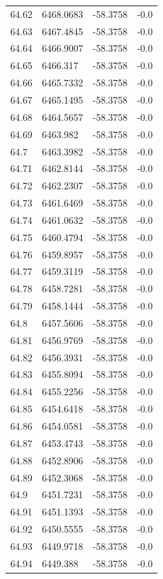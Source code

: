 \begin{table}[H]
\begin{tabular}{llll}
64.62 & 6468.0683 & -58.3758 & -0.0 \\
64.63 & 6467.4845 & -58.3758 & -0.0 \\
64.64 & 6466.9007 & -58.3758 & -0.0 \\
64.65 & 6466.317 & -58.3758 & -0.0 \\
64.66 & 6465.7332 & -58.3758 & -0.0 \\
64.67 & 6465.1495 & -58.3758 & -0.0 \\
64.68 & 6464.5657 & -58.3758 & -0.0 \\
64.69 & 6463.982 & -58.3758 & -0.0 \\
64.7 & 6463.3982 & -58.3758 & -0.0 \\
64.71 & 6462.8144 & -58.3758 & -0.0 \\
64.72 & 6462.2307 & -58.3758 & -0.0 \\
64.73 & 6461.6469 & -58.3758 & -0.0 \\
64.74 & 6461.0632 & -58.3758 & -0.0 \\
64.75 & 6460.4794 & -58.3758 & -0.0 \\
64.76 & 6459.8957 & -58.3758 & -0.0 \\
64.77 & 6459.3119 & -58.3758 & -0.0 \\
64.78 & 6458.7281 & -58.3758 & -0.0 \\
64.79 & 6458.1444 & -58.3758 & -0.0 \\
64.8 & 6457.5606 & -58.3758 & -0.0 \\
64.81 & 6456.9769 & -58.3758 & -0.0 \\
64.82 & 6456.3931 & -58.3758 & -0.0 \\
64.83 & 6455.8094 & -58.3758 & -0.0 \\
64.84 & 6455.2256 & -58.3758 & -0.0 \\
64.85 & 6454.6418 & -58.3758 & -0.0 \\
64.86 & 6454.0581 & -58.3758 & -0.0 \\
64.87 & 6453.4743 & -58.3758 & -0.0 \\
64.88 & 6452.8906 & -58.3758 & -0.0 \\
64.89 & 6452.3068 & -58.3758 & -0.0 \\
64.9 & 6451.7231 & -58.3758 & -0.0 \\
64.91 & 6451.1393 & -58.3758 & -0.0 \\
64.92 & 6450.5555 & -58.3758 & -0.0 \\
64.93 & 6449.9718 & -58.3758 & -0.0 \\
64.94 & 6449.388 & -58.3758 & -0.0 \\

\end{tabular}
\end{table}
